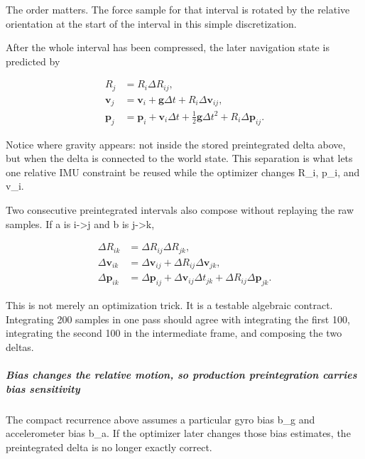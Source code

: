 The order matters. The force sample for that interval is rotated by the relative orientation at the start of the interval in this simple discretization.

After the whole interval has been compressed, the later navigation state is predicted by

\[
\begin{aligned}
R_j &= R_i\Delta R_{ij},\\
\mathbf v_j &= \mathbf v_i+\mathbf g\Delta t+R_i\Delta\mathbf v_{ij},\\
\mathbf p_j &= \mathbf p_i+\mathbf v_i\Delta t+\tfrac12\mathbf g\Delta t^2+R_i\Delta\mathbf p_{ij}.
\end{aligned}
\]

Notice where gravity appears: not inside the stored preintegrated delta above, but when the delta is connected to the world state. This separation is what lets one relative IMU constraint be reused while the optimizer changes R\_i, p\_i, and v\_i.

Two consecutive preintegrated intervals also compose without replaying the raw samples. If a is i-\textgreater j and b is j-\textgreater k,

\[
\begin{aligned}
\Delta R_{ik}&=\Delta R_{ij}\Delta R_{jk},\\
\Delta\mathbf v_{ik}&=\Delta\mathbf v_{ij}+\Delta R_{ij}\Delta\mathbf v_{jk},\\
\Delta\mathbf p_{ik}&=\Delta\mathbf p_{ij}+\Delta\mathbf v_{ij}\Delta t_{jk}+\Delta R_{ij}\Delta\mathbf p_{jk}.
\end{aligned}
\]

This is not merely an optimization trick. It is a testable algebraic contract. Integrating 200 samples in one pass should agree with integrating the first 100, integrating the second 100 in the intermediate frame, and composing the two deltas.

\subparagraph{Bias changes the relative motion, so production preintegration carries bias sensitivity}\label{04-visual-computing-ii-ch035-bias-changes-the-relative-motion-so-production-preintegration-carries-bias-sensitivity}

\hypertarget{04-visual-computing-ii-ch035-bias-changes-the-relative-motion-so-production-preintegration-carries-bias-sensitivity}{}

The compact recurrence above assumes a particular gyro bias b\_g and accelerometer bias b\_a. If the optimizer later changes those bias estimates, the preintegrated delta is no longer exactly correct.

